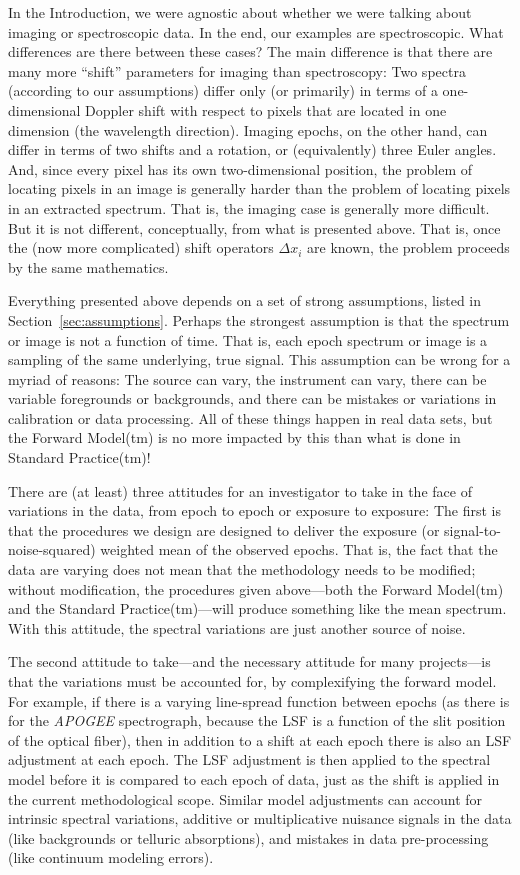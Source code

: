 \documentclass[modern]{aastex631}
\newcommand{\sectionname}{Section}
\begin{document}
In the Introduction, we were agnostic about whether we were talking about imaging or spectroscopic data.
In the end, our examples are spectroscopic.
What differences are there between these cases?
The main difference is that there are many more ``shift'' parameters for imaging than spectroscopy:
Two spectra (according to our assumptions) differ only (or primarily) in terms of a one-dimensional Doppler shift with respect to pixels that are located in one dimension (the wavelength direction).
Imaging epochs, on the other hand, can differ in terms of two shifts and a rotation, or (equivalently) three Euler angles.
And, since every pixel has its own two-dimensional position, the problem of locating pixels in an image is generally harder than the problem of locating pixels in an extracted spectrum.
That is, the imaging case is generally more difficult.
But it is not different, conceptually, from what is presented above.
That is, once the (now more complicated) shift operators $\Delta x_i$ are known, the problem proceeds by the same mathematics.

Everything presented above depends on a set of strong assumptions, listed in \sectionname~\ref{sec:assumptions}.
Perhaps the strongest assumption is that the spectrum or image is not a function of time.
That is, each epoch spectrum or image is a sampling of the same underlying, true signal.
This assumption can be wrong for a myriad of reasons:
The source can vary, the instrument can vary, there can be variable foregrounds or backgrounds, and there can be mistakes or variations in calibration or data processing.
All of these things happen in real data sets, but the Forward Model(tm) is no more impacted by this than what is done in Standard Practice(tm)!

There are (at least) three attitudes for an investigator to take in the face of variations in the data, from epoch to epoch or exposure to exposure:
The first is that the procedures we design are designed to deliver the exposure (or signal-to-noise-squared) weighted mean of the observed epochs.
That is, the fact that the data are varying does not mean that the methodology needs to be modified; without modification, the procedures given above---both the Forward Model(tm) and the Standard Practice(tm)---will produce something like the mean spectrum.
With this attitude, the spectral variations are just another source of noise.

The second attitude to take---and the necessary attitude for many projects---is that the variations must be accounted for, by complexifying the forward model.
For example, if there is a varying line-spread function between epochs (as there is for the \textsl{APOGEE} spectrograph, because the LSF is a function of the slit position of the optical fiber), then in addition to a shift at each epoch there is also an LSF adjustment at each epoch.
The LSF adjustment is then applied to the spectral model before it is compared to each epoch of data, just as the shift is applied in the current methodological scope.
Similar model adjustments can account for intrinsic spectral variations, additive or multiplicative nuisance signals in the data (like backgrounds or telluric absorptions), and mistakes in data pre-processing (like continuum modeling errors).
\end{document}
